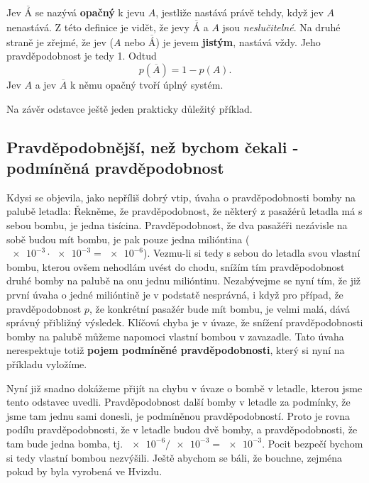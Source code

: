       Jev \(\overline{Á}\) se nazývá \textbf{opačný} k jevu \(A\), jestliže nastává právě tehdy, 
      když jev \(A\) nenastává. Z této definice je vidět, že jevy \(\overline{Á}\) a \(A\) jsou 
      \emph{neslučitelné}. Na druhé straně je zřejmé, že jev (\(A\) nebo \(\overline{Á}\)) je jevem 
      \textbf{jistým}, nastává vždy. Jeho pravděpodobnost je tedy \num{1}. Odtud
      \begin{equation}\label{mai:eq054}
        p(\overline{A}) = 1 - p(A).
      \end{equation}
      Jev \(A\) a jev \(\overline{A}\) k němu opačný tvoří úplný systém.
      
      Na závěr odstavce ještě jeden prakticky důležitý příklad.
      
      

    \subsection{Pravděpodobnější, než bychom čekali - podmíněná pravděpodobnost}
      Kdysi se objevila, jako nepříliš dobrý vtip, úvaha o pravděpodobnosti bomby na palubě letadla:
      Řekněme, že pravděpodobnost, že některý z pasažérů letadla má s sebou bombu, je jedna
      tisícina. Pravděpodobnost, že dva pasažéři nezávisle na sobě budou mít bombu, je pak pouze
      jedna milióntina (\(\num{e-3}\cdot\num{e-3}= \num{e-6}\)). Vezmu-li si tedy s sebou do 
      letadla svou vlastní bombu, kterou ovšem nehodlám uvést do chodu, snížím tím pravděpodobnost 
      druhé bomby na palubě na onu jednu milióntinu. Nezabývejme se nyní tím, že již první úvaha o 
      jedné milióntině je v podstatě nesprávná, i když pro případ, že pravděpodobnost \(p\), že 
      konkrétní pasažér bude mít bombu, je velmi malá, dává správný přibližný výsledek. Klíčová 
      chyba je v úvaze, že snížení pravděpodobnosti bomby na palubě můžeme napomoci vlastní bombou 
      v zavazadle. Tato úvaha nerespektuje totiž \textbf{pojem podmíněné pravděpodobnosti}, který 
      si nyní na příkladu vyložíme.
      
      
      
      Nyní již snadno dokážeme přijít na chybu v úvaze o bombě v letadle, kterou jsme tento 
      odstavec uvedli. Pravděpodobnost další bomby v letadle za podmínky, že jsme tam jednu sami 
      donesli, je podmíněnou pravděpodobností. Proto je rovna podílu pravděpodobnosti, že v letadle 
      budou dvě bomby, a pravděpodobnosti, že tam bude jedna bomba, tj. \(\num{e-6}/\num{e-3} = 
      \num{e-3}\). Pocit bezpečí bychom si tedy vlastní bombou nezvýšili. Ještě abychom se báli, že 
      bouchne, zejména pokud by byla vyrobená ve Hvizdu.
      
